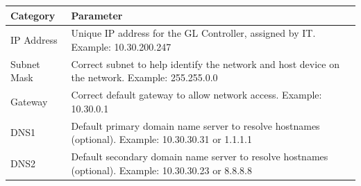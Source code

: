 \begin{longtable}[]{@{}ll@{}}
\toprule
\begin{minipage}[b]{0.22\columnwidth}\raggedright
Category\strut
\end{minipage} & \begin{minipage}[b]{0.72\columnwidth}\raggedright
Parameter\strut
\end{minipage}\tabularnewline
\midrule
\endhead
\begin{minipage}[t]{0.22\columnwidth}\raggedright
IP Address\strut
\end{minipage} & \begin{minipage}[t]{0.72\columnwidth}\raggedright
Unique IP address for the GL Controller, assigned by IT. Example:
10.30.200.247\strut
\end{minipage}\tabularnewline
\begin{minipage}[t]{0.22\columnwidth}\raggedright
Subnet Mask\strut
\end{minipage} & \begin{minipage}[t]{0.72\columnwidth}\raggedright
Correct subnet to help identify the network and host device on the
network. Example: 255.255.0.0\strut
\end{minipage}\tabularnewline
\begin{minipage}[t]{0.22\columnwidth}\raggedright
Gateway\strut
\end{minipage} & \begin{minipage}[t]{0.72\columnwidth}\raggedright
Correct default gateway to allow network access. Example:
10.30.0.1\strut
\end{minipage}\tabularnewline
\begin{minipage}[t]{0.22\columnwidth}\raggedright
DNS1\strut
\end{minipage} & \begin{minipage}[t]{0.72\columnwidth}\raggedright
Default primary domain name server to resolve hostnames (optional).
Example: 10.30.30.31 or 1.1.1.1\strut
\end{minipage}\tabularnewline
\begin{minipage}[t]{0.22\columnwidth}\raggedright
DNS2\strut
\end{minipage} & \begin{minipage}[t]{0.72\columnwidth}\raggedright
Default secondary domain name server to resolve hostnames (optional).
Example: 10.30.30.23 or 8.8.8.8\strut
\end{minipage}\tabularnewline
\bottomrule
\end{longtable}

